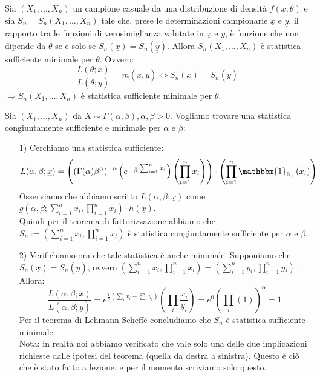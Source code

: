 \begin{teo}
Sia $(X_1,...,X_n)$ un campione casuale da una distribuzione di densità $f(x;\theta)$ e sia $S_n=S_n(X_1,...,X_n)$ tale che, prese le determinazioni campionarie $\underline{x}$ e $\underline{y}$, il rapporto tra le funzioni di verosimiglianza valutate in $\underline{x}$ e $\underline{y}$, è funzione che non dipende da $\theta$ se e solo se $S_n(\underline{x})=S_n(\underline{y})$. Allora $S_n(X_1,...,X_n)$ è statistica sufficiente minimale per $\theta$. Ovvero:
$$\frac{L(\theta;\underline{x})}{L(\theta;\underline{y})}=m(\underline{x},\underline{y}) \Longleftrightarrow S_n(\underline{x})=S_n(\underline{y})$$
$\Longrightarrow S_n(X_1,...,X_n)$ è statistica sufficiente minimale per $\theta$.
\end{teo}

\begin{esempio} Sia $(X_1,...,X_n)$ da $X \sim \Gamma(\alpha,\beta), \alpha, \beta >0$. Vogliamo trovare una statistica congiuntamente sufficiente e minimale per $\alpha$ e $\beta$:
\begin{enumerate}
\item [1)] Cerchiamo una statistica sufficiente:
$$L(\alpha,\beta;\underline{x}) = \left( \left( \Gamma(\alpha)\beta^{\alpha}\right)^{-n} \left( e^{-\frac{1}{\beta} \sum_{i=1}^n x_i} \right) \left( \prod_{i=1}^n x_i \right) \right) \cdot \left( \prod_{i=1}^n \mathbbm{1}_{\mathbb{R_+}}(x_i) \right)$$
Osserviamo che abbiamo scritto $L(\alpha,\beta;\underline{x})$ come $g \left( \alpha,\beta; \sum_{i=1}^n x_i, \prod_{i=1}^n x_i \right) \cdot h(\underline{x})$.\\
Quindi per il teorema di fattorizzazione abbiamo che $S_n:=\left( \sum_{i=1}^n x_i, \prod_{i=1}^n x_i \right)$ è statistica congiuntamente sufficiente per $\alpha$ e $\beta$.
\item [2)] Verifichiamo ora che tale statistica è anche minimale. Supponiamo che $S_n(\underline{x})=S_n(\underline{y})$, ovvero $\left( \sum_{i=1}^n x_i, \prod_{i=1}^n x_i \right) = \left( \sum_{i=1}^n y_i, \prod_{i=1}^n y_i \right)$. Allora:
$$\frac{L(\alpha,\beta;\underline{x})}{L(\alpha,\beta;\underline{y})} = e^{\frac{1}{\beta} \left( \sum_i x_i - \sum_i y_i \right)} \left( \prod_i \frac{x_i}{y_i} \right) = e^{0} \left( \prod_i (1) \right)^{\alpha} = 1$$
Per il teorema di Lehmann-Scheffé concludiamo che $S_n$ è statistica sufficiente minimale.\\
Nota: in realtà noi abbiamo verificato che vale solo una delle due implicazioni richieste dalle ipotesi del teorema (quella da destra a sinistra). Questo è ciò che è stato fatto a lezione, e per il momento scriviamo solo questo.
\end{enumerate}
\end{esempio}


